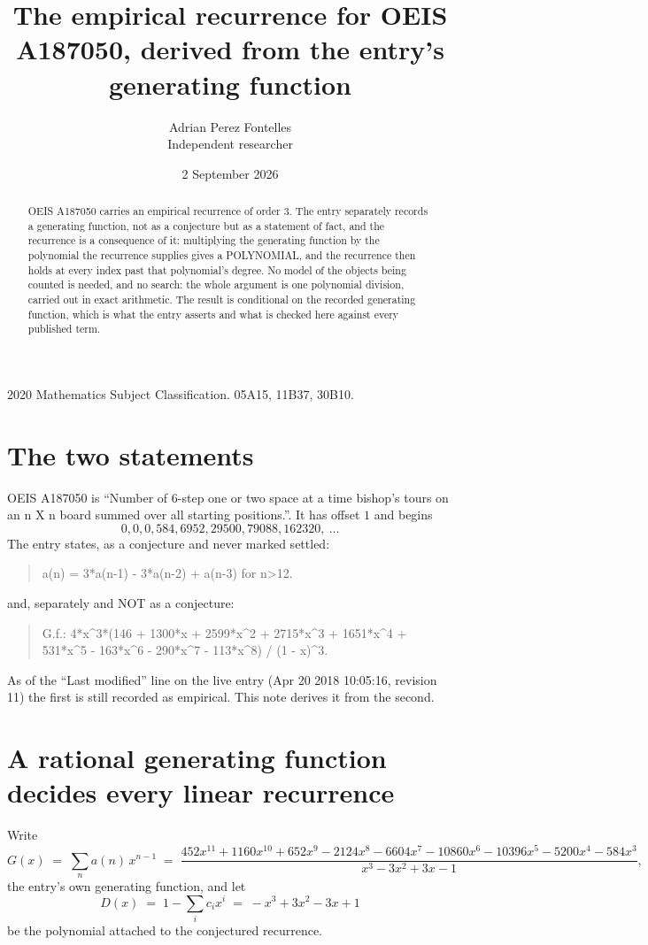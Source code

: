\documentclass[11pt,a4paper]{article}
\title{The empirical recurrence for OEIS A187050, derived from the entry's generating function}
\author{Adrian Perez Fontelles\\ \small Independent researcher}
\date{2 September 2026}
\theoremstyle{plain}
\theoremstyle{definition}
\begin{document}
\maketitle

\begin{abstract}
OEIS A187050 carries an empirical recurrence of order $3$. The entry separately records a
generating function, not as a conjecture but as a statement of fact, and the recurrence is a
consequence of it: multiplying the generating function by the polynomial the recurrence
supplies gives a POLYNOMIAL, and the recurrence then holds at every index past that
polynomial's degree. No model of the objects being counted is needed, and no search: the
whole argument is one polynomial division, carried out in exact arithmetic. The result is
conditional on the recorded generating function, which is what the entry asserts and what is
checked here against every published term.
\end{abstract}

\noindent\small 2020 Mathematics Subject Classification. 05A15, 11B37, 30B10.\normalsize

\section{The two statements}

OEIS A187050 is ``Number of 6-step one or two space at a time bishop's tours on an n X n board summed over all starting positions.''. It has offset $1$ and begins
\[
0, 0, 0, 584, 6952, 29500, 79088, 162320,\ \dots
\]
The entry states, as a conjecture and never marked settled:
\begin{quote}
a(n) = 3*a(n-1) - 3*a(n-2) + a(n-3) for n>12.
\end{quote}
and, separately and NOT as a conjecture:
\begin{quote}
G.f.: 4*x\^{}3*(146 + 1300*x + 2599*x\^{}2 + 2715*x\^{}3 + 1651*x\^{}4 + 531*x\^{}5 - 163*x\^{}6 - 290*x\^{}7 - 113*x\^{}8) / (1 - x)\^{}3.
\end{quote}
As of the ``Last modified'' line on the live entry (Apr 20 2018 10:05:16, revision 11) the first is still
recorded as empirical. This note derives it from the second.

\section{A rational generating function decides every linear recurrence}

Write
\[
G(x)\;=\;\sum_{n}a(n)\,x^{n-1}\;=\;\frac{452 x^{11} + 1160 x^{10} + 652 x^{9} - 2124 x^{8} - 6604 x^{7} - 10860 x^{6} - 10396 x^{5} - 5200 x^{4} - 584 x^{3}}{x^{3} - 3 x^{2} + 3 x - 1},
\]
the entry's own generating function, and let
\[
D(x)\;=\;1-\sum_i c_i x^{i}\;=\;- x^{3} + 3 x^{2} - 3 x + 1
\]
be the polynomial attached to the conjectured recurrence.
\end{document}
